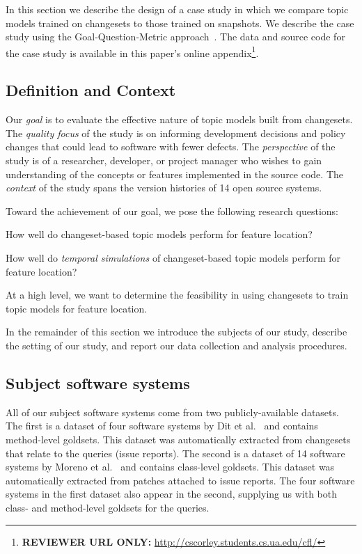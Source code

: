 
In this section we describe the design of a case study in which we
compare topic models trained on changesets to those trained on snapshots.
We describe the case study using the Goal-Question-Metric approach~\cite{Basili-etal:94}.
The data and source code for the case study is available in this paper's online
appendix\footnote{\textbf{REVIEWER URL ONLY:} \url{http://cscorley.students.cs.ua.edu/cfl/}}.

\subsection{Definition and Context}

Our \textit{goal} is to evaluate the effective nature of topic models built
from changesets.
The \textit{quality focus} of the study is on informing development
decisions and policy changes that could lead to software with fewer
defects.
The \textit{perspective} of the study is of a researcher, developer, or
project manager who wishes to gain understanding of the concepts or
features implemented in the source code.
The \textit{context} of the study spans the version histories of 14
open source systems.

Toward the achievement of our goal, we pose the following research questions:
\begin{description}[font=\itshape\mdseries,leftmargin=10mm,style=sameline]
    \item[RQ1] How well do changeset-based topic models perform for feature location?
    \item[RQ2] How well do \emph{temporal simulations} of changeset-based topic models perform for feature location?
\end{description}
At a high level, we want to determine the feasibility in using changesets
to train topic models for feature location.

In the remainder of this section we introduce the subjects of our study,
describe the setting of our study, and report our data collection and analysis procedures.


\subsection{Subject software systems}

All of our subject software systems come from two publicly-available
datasets.
The first is a dataset of four software systems by Dit et al.~\cite{Dit-etal:2013} and contains method-level goldsets.
This dataset was automatically extracted from changesets that relate to the queries (issue reports).
The second is a dataset of 14 software systems by Moreno et al.~\cite{Moreno-etal:2014} and contains class-level goldsets.
This dataset was automatically extracted from patches attached to issue reports.
The four software systems in the first dataset also appear in the second,
supplying us with both class- and method-level goldsets for the queries.

